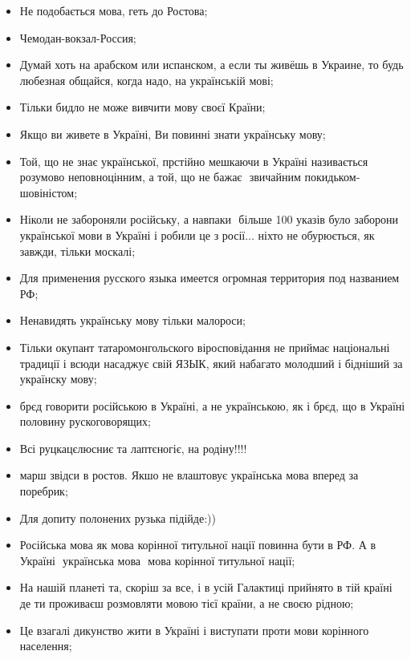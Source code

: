 \begin{itemize} %
\item Не подобається мова, геть до Ростова; 
\item Чемодан-вокзал-Россия;
\item Думай хоть на арабском или испанском, а если ты живёшь в Украине, то будь
любезная общайся, когда надо, на українській мові;
\item Тільки бидло не може вивчити мову своєї Країни;
\item Якщо ви живете в Україні, Ви повинні знати українську мову;
\item Той, що не знає української, прстійно мешкаючи в Україні називається розумово неповноцінним, а той, що не бажає ­ звичайним покидьком­шовіністом;
\item Ніколи не забороняли російську, а навпаки ­ більше 100 указів було заборони української мови в Україні і робили це з росії... ніхто не обурюється, як завжди, тільки москалі;
\item Для применения русского языка имеется огромная территория под названием РФ;
\item Ненавидять українську мову тільки малороси;
\item Тільки окупант татаромонгольского віросповідання не приймає національні традиції і всюди насаджує свій ЯЗЫК, який набагато молодший і бідніший за українску мову;
\item брєд говорити російською в Україні, а не українською, як і брєд, що в Україні половину рускоговорящих;
\item Всі руцкацєлюсниє та лаптєногіє, на родіну!!!!
\item марш звідси в ростов. Якшо не влаштовує українська мова вперед за поребрик;
\item Для допиту полонених рузька підійде:))
\item Російська мова як мова корінної титульної нації повинна бути в РФ. А в Україні ­ українська мова ­ мова корінної титульної нації;
\item На нашій планеті та, скоріш за все, і в усій Галактиці прийнято в тій країні де ти проживаєш розмовляти мовою тієї країни, а не своєю рідною;
\item Це взагалі дикунство жити в Україні і виступати проти мови корінного населення;
\end{itemize} %

